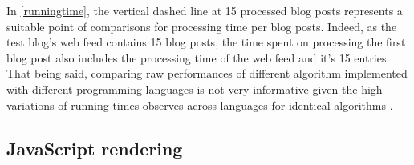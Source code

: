 In \autoref{runningtime}, the vertical dashed line at 15 processed blog posts represents a suitable point of comparisons for processing time per blog posts. Indeed, as the test blog's web feed contains 15 blog posts, the time spent on processing the first blog post also includes the processing time of the web feed and it's 15 entries. That being said, comparing raw performances of different algorithm implemented with different programming languages is not very informative given the high variations of running times observes across languages for identical algorithms \cite{hundt2011}.



\subsection{JavaScript rendering}





